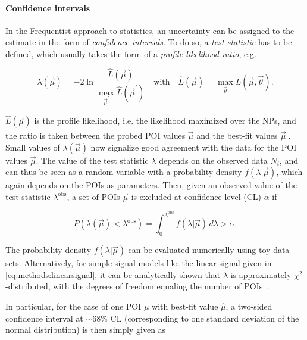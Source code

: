 \paragraph{Confidence intervals}

In the Frequentist approach to statistics, an uncertainty can be assigned to the estimate in the form of \textit{confidence intervals}. To do so, a \textit{test statistic} has to be defined, which usually takes the form of a \textit{profile likelihood ratio}, e.g.~\cite{Cowan:2010js}

\begin{equation}
\label{eq:methods:teststat}
    \lambda (\vec{\mu}) = - 2 \ln \frac { \hat{L} (\vec{\mu}) } { \max_{\vec{\mu}^\prime} \hat{L} (\vec{\mu}^\prime) } 
    \quad \text{with} \quad 
    \hat{L} (\vec{\mu}) = \max_{\vec{\theta}} L (\vec{\mu}, \vec{\theta}).
\end{equation}

$\hat{L} (\vec{\mu})$ is the profile likelihood, i.e. the likelihood maximized over the NPs, and the ratio is taken between the probed POI values $\vec{\mu}$ and the best-fit values $\vec{\mu}^\prime$. Small values of $ \lambda (\vec{\mu})$ now signalize good agreement with the data for the POI values $\vec{\mu}$. The value of the test statistic $\lambda$ depends on the observed data $N_i$, and can thus be seen as a random variable with a probability density $f(\lambda | \vec{\mu})$, which again depends on the POIs as parameters. Then, given an observed value of the test statistic $\lambda^{\mathrm{obs}}$, a set of POIs $\vec{\mu}$ is excluded at confidence level (CL) $\alpha$ if 

\begin{equation}
\label{eq:methods:cl}
    P \left( \lambda (\vec{\mu}) < \lambda^{\mathrm{obs}} \right) = \int_0^{\lambda^{\mathrm{obs}}} f(\lambda | \vec{\mu}) \, d\lambda > \alpha.
\end{equation}

The probability density $f(\lambda | \vec{\mu})$ can be evaluated numerically using toy data sets. Alternatively, for simple signal models like the linear signal given in \cref{eq:methods:linearsignal}, it can be analytically shown that $\lambda$ is approximately $\chi^2$-distributed, with the degrees of freedom equaling the number of POIs~\cite{Wilks:1938dza,Wald:1943}.%

In particular, for the case of one POI $\mu$ with best-fit value $\hat{\mu}$, a two-sided confidence interval at $\sim 68\%$ CL (corresponding to one standard deviation of the normal distribution) is then simply given as~\cite{Cowan:2010js}

